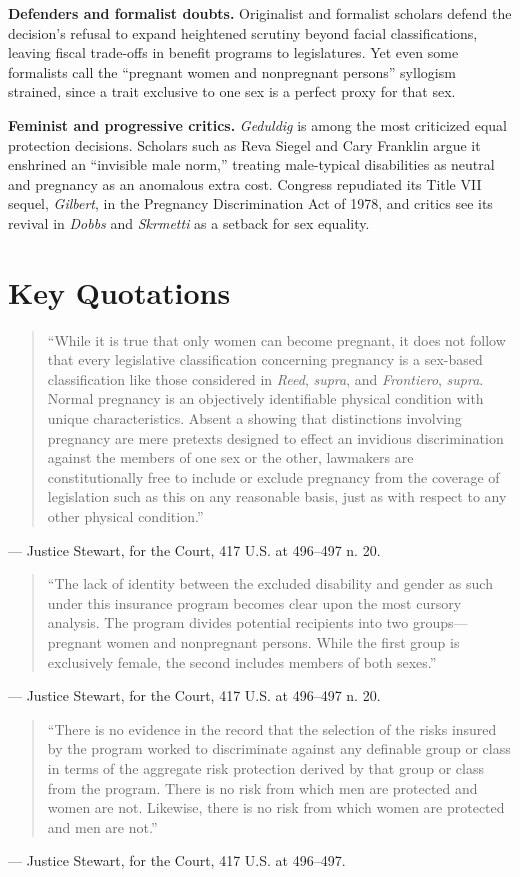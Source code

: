 \documentclass[12pt]{article}
\begin{document}
\textbf{Defenders and formalist doubts.} Originalist and formalist scholars defend the decision's refusal to expand heightened scrutiny beyond facial classifications, leaving fiscal trade-offs in benefit programs to legislatures. Yet even some formalists call the ``pregnant women and nonpregnant persons'' syllogism strained, since a trait exclusive to one sex is a perfect proxy for that sex.

\textbf{Feminist and progressive critics.} \textit{Geduldig} is among the most criticized equal protection decisions. Scholars such as Reva Siegel and Cary Franklin argue it enshrined an ``invisible male norm,'' treating male-typical disabilities as neutral and pregnancy as an anomalous extra cost. Congress repudiated its Title VII sequel, \textit{Gilbert}, in the Pregnancy Discrimination Act of 1978, and critics see its revival in \textit{Dobbs} and \textit{Skrmetti} as a setback for sex equality.

\section{Key Quotations}

\begin{quote}
``While it is true that only women can become pregnant, it does not follow that every legislative classification concerning pregnancy is a sex-based classification like those considered in \textit{Reed}, \textit{supra}, and \textit{Frontiero}, \textit{supra}. Normal pregnancy is an objectively identifiable physical condition with unique characteristics. Absent a showing that distinctions involving pregnancy are mere pretexts designed to effect an invidious discrimination against the members of one sex or the other, lawmakers are constitutionally free to include or exclude pregnancy from the coverage of legislation such as this on any reasonable basis, just as with respect to any other physical condition.''
\end{quote}
\noindent --- Justice Stewart, for the Court, 417 U.S. at 496--497 n. 20.

\begin{quote}
``The lack of identity between the excluded disability and gender as such under this insurance program becomes clear upon the most cursory analysis. The program divides potential recipients into two groups---pregnant women and nonpregnant persons. While the first group is exclusively female, the second includes members of both sexes.''
\end{quote}
\noindent --- Justice Stewart, for the Court, 417 U.S. at 496--497 n. 20.

\begin{quote}
``There is no evidence in the record that the selection of the risks insured by the program worked to discriminate against any definable group or class in terms of the aggregate risk protection derived by that group or class from the program. There is no risk from which men are protected and women are not. Likewise, there is no risk from which women are protected and men are not.''
\end{quote}
\noindent --- Justice Stewart, for the Court, 417 U.S. at 496--497.
\end{document}
